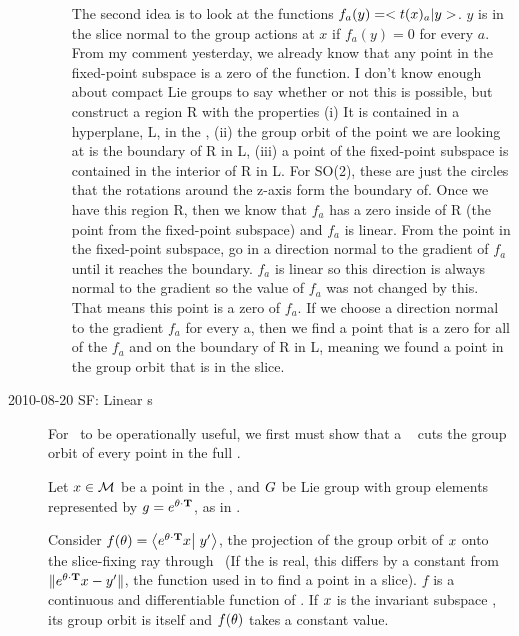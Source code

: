 \begin{description}
\begin{enumerate}
The second idea is to look at the functions $f_a(y)=<t(x)_a| y>$. $ y$ is in the slice normal to the group actions at $x$ if $f_a(y)=0$ for every $a$. From my comment yesterday, we already know that any point in the fixed-point subspace is a zero of the function. I don't know enough about compact Lie groups to say whether or not this is possible, but construct a region R with the properties (i) It is contained in a hyperplane, L, in the {\statesp}, (ii) the group orbit of the point we are looking at is the boundary of R in L, (iii) a point of the fixed-point subspace is contained in the interior of R in L. For SO(2), these are just the circles that the rotations around the z-axis form the boundary of. Once we have this region R, then we know that $f_a$ has a zero inside of R (the point from the fixed-point subspace) and $f_a$ is linear. From the point in the fixed-point subspace, go in a direction normal to the gradient of $f_a$ until it reaches the boundary. $f_a$ is linear so this direction is always normal to the gradient so the value of $f_a$ was not changed by this. That means this point is a zero of $f_a$. If we choose a direction normal to the gradient $f_a$ for every a, then we find a point that is a zero for all of the $f_a$ and on the boundary of R in L, meaning we found a point in the group orbit that is in the slice.
\end{enumerate}

\item[2010-08-20 SF: Linear \slice s]
For \mslices\ to be operationally useful, we first must show that a \slice\ 
cuts the group orbit of every point in the full \statesp.

Let $x \in {\cal M}$ be a point in the \statesp, and $G$ be Lie group with group elements represented  by $g=e^{{\bf \theta} \cdot \mathbf{T}}$, as in .

Consider $f(\gSpace)=\braket{e^{\gSpace \cdot \Lg} \ssp}{\slicep}$, the projection of the group orbit of $x$ onto the slice-fixing ray through \slicep\ (If the {\statesp} is real, this differs by a constant from $\|e^{{\bf \theta} \cdot \mathbf{T}}x - {y'}\|$, the function used in to find a point in a slice).
$f$ is a continuous and differentiable function of \gSpace. If $x$ is the invariant subspace , its group orbit is itself and $f({\bf \theta})$ takes a constant value.


\end{description}
